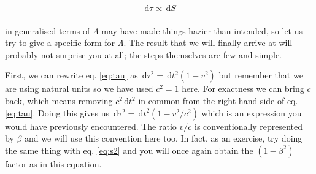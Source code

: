 \documentclass[english,seminar]{lecture}
\newcommand{\diff}{\,\textrm{d}}
\begin{document}
\begin{align}
	\diff \tau \propto \diff S \label{eq:s-tau-proportionality}
\end{align}%
%
\\ in generalised terms of $\Lambda$ may have made things hazier than intended, so let us try to give a specific form for $\Lambda$. The result that we will finally arrive at will probably not surprise you at all; the steps themselves are few and simple.

First, we can rewrite eq. \eqref{eq:tau} as $\diff \tau^2 = \diff t^2 \left(1 - v^2\right)$ but remember that we are using natural units so we have used $c^2=1$ here. For exactness we can bring $c$ back, which means removing $c^2\diff t^2$ in common from the right-hand side of eq. \eqref{eq:tau}. Doing this gives us $\diff \tau^2 = \diff t^2 \left(1 - v^2/c^2\right)$ which is an expression you would have previously encountered. The ratio $v/c$ is conventionally represented by $\beta$ and we will use this convention here too. In fact, as an exercise, try doing the same thing with eq. \eqref{eq:s2} and you will once again obtain the $\left(1-\beta^2\right)$ factor as in this equation.
\end{document}
